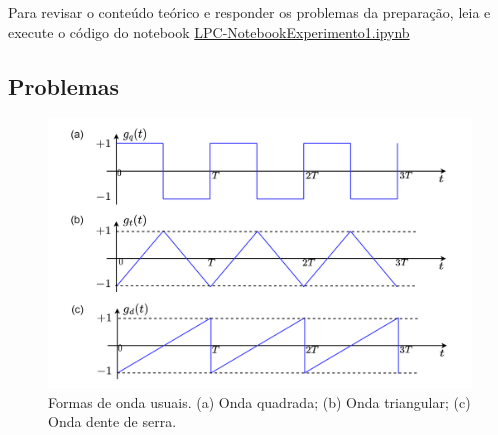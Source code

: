 \documentclass[12pt,addpoints]{exam}
\begin{document}
Para revisar o conteúdo teórico e responder os problemas da preparação, leia e execute o código do notebook \href{https://github.com/edsonportosilva/LPC/blob/master/Jupyter/Lab1/LPC-NotebookExperimento1.ipynb}{LPC-NotebookExperimento1.ipynb}

\subsection{Problemas}

\begin{figure}[h]
        \centering
        \includegraphics[width=0.75\linewidth]{./Figuras/Labo1Fig1.png}
        \caption{Formas de onda usuais. (a) Onda quadrada; (b) Onda triangular; (c) Onda dente de serra. }
        \label{fig:sinaisusuais}
\end{figure}
\end{document}
